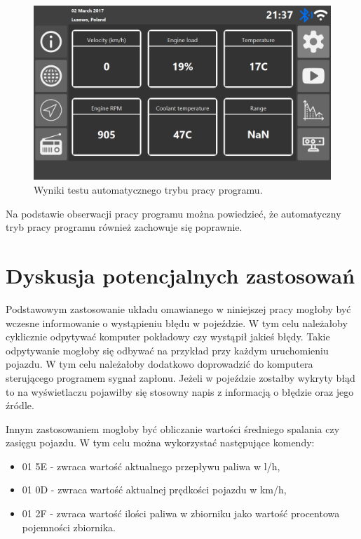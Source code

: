 \documentclass[12pt, twoside]{article} %
\numberwithin{equation}{subsection}
\numberwithin{figure}{section}
\numberwithin{table}{section}
\begin{document}
	\begin{figure}[!h]
			\centering
			\includegraphics[scale=0.55]{Images/rys_test_auto.png}
			\caption{Wyniki testu automatycznego trybu pracy programu.}
			\label{rys_wyniki_testu_automatycznego}
		\end{figure}
	
	
	Na podstawie obserwacji pracy programu można powiedzieć, że automatyczny tryb pracy programu również zachowuje się poprawnie.
	
	\newpage
	
	\section{Dyskusja potencjalnych zastosowań}
	
	\hspace{0.5cm}Podstawowym zastosowanie układu omawianego w niniejszej pracy mogłoby być wczesne informowanie o wystąpieniu błędu w pojeździe. W tym celu należałoby cyklicznie odpytywać komputer pokładowy czy wystąpił jakieś błędy. Takie odpytywanie mogłoby się odbywać na przykład przy każdym uruchomieniu pojazdu. W tym celu należałoby dodatkowo doprowadzić do komputera sterującego programem sygnał zapłonu. Jeżeli w pojeździe zostałby wykryty błąd to na wyświetlaczu pojawiłby się stosowny napis z informacją o błędzie oraz jego źródle.
	
	Innym zastosowaniem mogłoby być obliczanie wartości średniego spalania czy zasięgu pojazdu. W tym celu można wykorzystać następujące komendy:
	
	\begin{itemize}
		\item{01 5E - zwraca wartość aktualnego przepływu paliwa w l/h,}
		\item{01 0D - zwraca wartość aktualnej prędkości pojazdu w km/h,}
		\item{01 2F - zwraca wartość ilości paliwa w zbiorniku jako wartość procentowa pojemności zbiornika.}
	\end{itemize}
	
\end{document}
